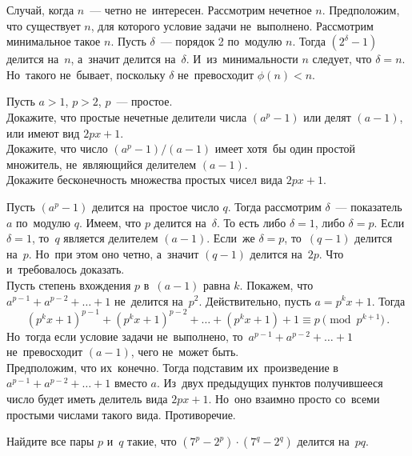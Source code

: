 \ifincludesolutions
Случай, когда $n$~--- четно не~интересен.
Рассмотрим нечетное $n$.
Предположим, что существует $n$, для которого условие задачи не~выполнено.
Рассмотрим минимальное такое $n$.
Пусть $\delta$~--- порядок 2 по~модулю $n$.
Тогда $(2^{\delta} - 1)$ делится на~$n$, а~значит делится на~$\delta$.
И~из~минимальности $n$ следует, что $\delta = n$.
Но~такого не~бывает, поскольку $\delta$ не~превосходит $\phi(n) < n$. 
\fi %

\begin{problems}

\item
Пусть $a > 1$, $p > 2$, $p$~--- простое.
\\
\subproblem
Докажите, что простые нечетные делители числа $(a^p - 1)$ или делят $(a - 1)$,
или имеют вид $2 p x + 1$.
\\
\subproblem
Докажите, что число $(a^p - 1) / (a - 1)$ имеет хотя~бы один простой
множитель, не~являющийся делителем $(a - 1)$.
\\
\subproblem
Докажите бесконечность множества простых чисел вида $2 p x + 1$.

\end{problems}

\ifincludesolutions
\setcounter{jeolmsubproblem}{0}%
\subproblem
Пусть $(a^p - 1)$ делится на~простое число $q$.
Тогда рассмотрим $\delta$~--- показатель $a$ по~модулю $q$.
Имеем, что $p$ делится на~$\delta$.
То есть либо $\delta = 1$, либо $\delta = p$.
Если $\delta = 1$, то~$q$ является делителем $(a - 1)$.
Если~же $\delta = p$, то~$(q - 1)$ делится на~$p$.
Но~при этом оно четно, а~значит $(q - 1)$ делится на~$2 p$.
Что и~требовалось доказать.
\\
\subproblem
Пусть степень вхождения $p$ в~$(a - 1)$ равна $k$.
Покажем, что $a^{p-1} + a^{p-2} + \ldots + 1$ не~делится на~$p^2$.
Действительно, пусть $a = p^k x + 1$.
Тогда
\[
    (p^k x + 1)^{p-1} + (p^k x + 1)^{p-2} + \ldots + (p^k x + 1) + 1
\equiv
    p
\pmod{p^{k+1}}
\,.\]
Но~тогда если условие задачи не~выполнено, то~$a^{p-1} + a^{p-2} + \ldots + 1$
не~превосходит $(a - 1)$, чего не~может быть.
\\
\subproblem
Предположим, что их~конечно.
Тогда подставим их~произведение в~$a^{p-1} + a^{p-2} + \ldots + 1$ вместо $a$.
Из~двух предыдущих пунктов получившееся число будет иметь делитель
вида $2 p x + 1$.
Но~оно взаимно просто со~всеми простыми числами такого вида.
Противоречие.
\fi %

\begin{problems}


\item
Найдите все пары $p$ и~$q$ такие, что $(7^{p} - 2^{p}) \cdot (7^{q} - 2^{q})$
делится на~$p q$.

\end{problems}

